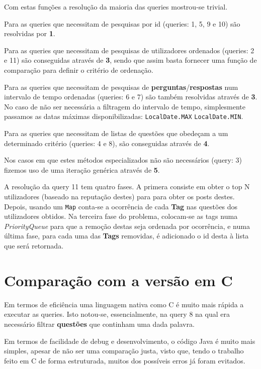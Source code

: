 \documentclass[10pt,a4paper]{report}
\begin{document}
    Com estas funções a resolução da maioria das queries mostrou-se
    trivial.

    Para as queries que necessitam de pesquisas por id (queries: 1, 5, 9 e 10)
    são resolvidas por \textbf{1}.

    Para as queries que necessitam de pesquisas de utilizadores ordenados
    (queries: 2 e 11) são conseguidas através de \textbf{3}, sendo que assim
    basta fornecer uma função de comparação para definir o critério de
    ordenação.

    Para as queries que necessitam de pesquisas de
    \textbf{perguntas}/\textbf{respostas} num intervalo de tempo ordenadas
    (queries: 6 e 7) são também resolvidas através de \textbf{3}. No caso de não
    ser necessária a filtragem do intervalo de tempo, simplesmente passamos as
    datas máximas disponibilizadas: \texttt{LocalDate.MAX}
    \texttt{LocalDate.MIN}.

    Para as queries que necessitam de listas de questões que obedeçam a um
    determinado critério (queries: 4 e 8), são conseguidas através de
    \textbf{4}.

    Nos casos em que estes métodos especializados não são necessários (query: 3)
    fizemos uso de uma iteração genérica através de \textbf{5}.

    A resolução da query 11 tem quatro fases. A primera consiste em obter o top
    N utilizadores (baseado na reputação destes) para para obter os posts
    destes.
    Depois, usando um \texttt{Map} conta-se a ocorrência de cada
    \textbf{Tag} nas questões dos utilizadores obtidos. Na terceira fase do
    problema, colocam-se as tags numa \textit{PriorityQueue} para que a
    remoção destas seja ordenada por ocorrência, e numa última fase, para cada
    uma das \textbf{Tags} removidas, é adicionado o id desta à lista que será
    retornada.

\chapter{Comparação com a versão em C}
    Em termos de eficiência uma linguagem nativa como C é muito mais rápida a
    executar as queries. Isto notou-se, essencialmente, na query 8 na qual era
    necessário filtrar \textbf{questões} que continham uma dada palavra.

    Em termos de facilidade de debug e desenvolvimento, o código Java é muito
    mais simples, apesar de não ser uma comparação justa, visto que, tendo o
    trabalho feito em C de forma estruturada, muitos dos possíveis erros já foram
    evitados.
\end{document}
